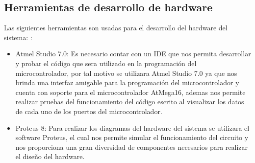 \subsection{Herramientas de desarrollo de hardware}
Las siguientes herramientas son usadas para el desarrollo del hardware del sistema:
:
\begin{itemize}
	\item Atmel Studio 7.0: Es necesario contar con un IDE que nos permita desarrollar y probar el código que sera utilizado en la programación del microcontrolador, por tal motivo se utilizara Atmel Studio 7.0 ya que nos brinda una interfaz amigable para la programación del microcontrolador y cuenta con soporte para el microcontrolador AtMega16, ademas nos permite realizar pruebas del funcionamiento del código escrito al visualizar los datos de cada uno de los puertos del microcontrolador.
	\item Proteus 8: Para realizar los diagramas del hardware del sistema se utilizara el software Proteus, el cual nos permite simular el funcionamiento del circuito y nos proporciona una gran diversidad de componentes necesarios para realizar el diseño del hardware.
\end{itemize}

